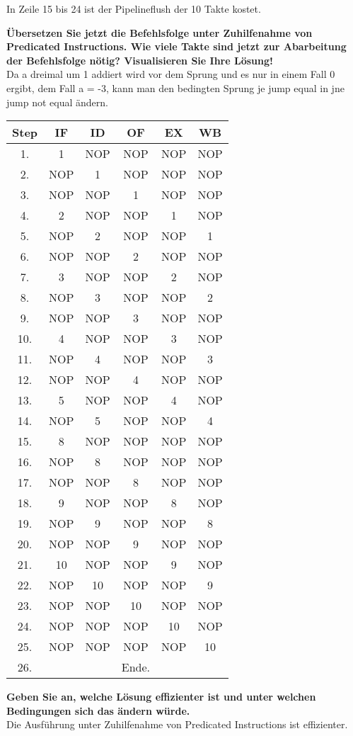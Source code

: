 \documentclass[11pt]{article}
\newcommand{\aufgabe}[1]{\item{\bf #1}}
\begin{document}
In Zeile 15 bis 24 ist der Pipelineflush der 10 Takte kostet.
\aufgabe{Übersetzen Sie jetzt die Befehlsfolge unter Zuhilfenahme von Predicated Instructions. Wie viele Takte sind jetzt zur Abarbeitung der Befehlsfolge nötig? Visualisieren Sie Ihre Lösung!}\\
Da a dreimal um 1 addiert wird vor dem Sprung und es nur in einem Fall 0 ergibt, dem Fall a = -3, kann man den bedingten Sprung je \glqq jump equal\grqq{} in jne \glqq jump not equal\grqq{} ändern.

\begin{center}
\begin{tabular}{c|c|c|c|c|c}
    Step & IF & ID & OF & EX & WB \\
    \hline
    1. & 1 & NOP & NOP & NOP & NOP \\
    2. & NOP & 1 & NOP & NOP & NOP \\
    3. & NOP & NOP & 1 & NOP & NOP \\
    4. & 2 & NOP & NOP & 1 & NOP \\
    5. & NOP & 2 & NOP & NOP & 1 \\
    6. & NOP & NOP & 2 & NOP & NOP \\
    7. & 3 & NOP & NOP & 2 & NOP \\
    8. & NOP & 3 & NOP & NOP & 2\\
    9. & NOP & NOP & 3 & NOP & NOP \\
    10. & 4 & NOP & NOP & 3 & NOP \\
    11. & NOP & 4 & NOP & NOP & 3 \\
    12. & NOP & NOP & 4 & NOP & NOP \\
    13. & 5 & NOP & NOP & 4 & NOP \\
    14. & NOP & 5 & NOP & NOP & 4 \\
    15. & 8 & NOP & NOP & NOP & NOP \\
    16. & NOP & 8 & NOP & NOP & NOP \\
    17. & NOP & NOP & 8 & NOP & NOP \\
    18. & 9 & NOP & NOP & 8 & NOP \\
    19. & NOP & 9 & NOP & NOP & 8 \\
    20. & NOP & NOP & 9 & NOP & NOP \\
    21. & 10 & NOP & NOP & 9 & NOP \\
    22. & NOP & 10 & NOP & NOP & 9 \\
    23. & NOP & NOP & 10 & NOP & NOP \\
    24. & NOP & NOP & NOP & 10 & NOP \\
    25. & NOP & NOP & NOP & NOP & 10 \\
    26. &  &  & Ende. &  & 
\end{tabular}
\end{center}
\aufgabe{Geben Sie an, welche Lösung effizienter ist und unter welchen Bedingungen sich das ändern würde.}\\
Die Ausführung unter Zuhilfenahme von Predicated Instructions ist effizienter.
\end{document}
